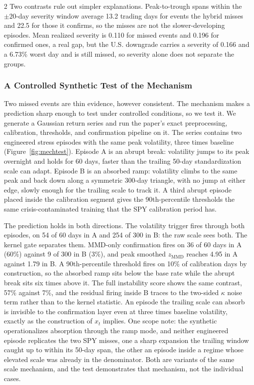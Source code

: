 \documentclass{book}
\begin{document}
\begin{multicols}{2}
Two contrasts rule out simpler explanations. Peak-to-trough spans within the $\pm20$-day severity window average 13.2 trading days for events the hybrid misses and 22.5 for those it confirms, so the misses are not the slower-developing episodes. Mean realized severity is 0.110 for missed events and 0.196 for confirmed ones, a real gap, but the U.S. downgrade carries a severity of 0.166 and a 6.73\% worst day and is still missed, so severity alone does not separate the groups.

\subsubsection{A Controlled Synthetic Test of the Mechanism}
\label{sec:mechtest}
Two missed events are thin evidence, however consistent. The mechanism makes a prediction sharp enough to test under controlled conditions, so we test it. We generate a Gaussian return series and run the paper's exact preprocessing, calibration, thresholds, and confirmation pipeline on it. The series contains two engineered stress episodes with the same peak volatility, three times baseline (Figure~\ref{fig:mechtest}). Episode A is an abrupt break: volatility jumps to its peak overnight and holds for 60 days, faster than the trailing 50-day standardization scale can adapt. Episode B is an absorbed ramp: volatility climbs to the same peak and back down along a symmetric 300-day triangle, with no jump at either edge, slowly enough for the trailing scale to track it. A third abrupt episode placed inside the calibration segment gives the 90th-percentile thresholds the same crisis-contaminated training that the SPY calibration period has.

The prediction holds in both directions. The volatility trigger fires through both episodes, on 54 of 60 days in A and 254 of 300 in B: the raw scale sees both. The kernel gate separates them. MMD-only confirmation fires on 36 of 60 days in A (60\%) against 9 of 300 in B (3\%), and peak smoothed $z_{\mathrm{MMD}}$ reaches 4.95 in A against 1.79 in B. A 90th-percentile threshold fires on 10\% of calibration days by construction, so the absorbed ramp sits below the base rate while the abrupt break sits six times above it. The full instability score shows the same contrast, 57\% against 7\%, and the residual firing inside B traces to the two-sided $\kappa$ noise term rather than to the kernel statistic. An episode the trailing scale can absorb is invisible to the confirmation layer even at three times baseline volatility, exactly as the construction of $x_t$ implies. One scope note: the synthetic operationalizes absorption through the ramp mode, and neither engineered episode replicates the two SPY misses, one a sharp expansion the trailing window caught up to within its 50-day span, the other an episode inside a regime whose elevated scale was already in the denominator. Both are variants of the same scale mechanism, and the test demonstrates that mechanism, not the individual cases.
\end{multicols}
\end{document}
